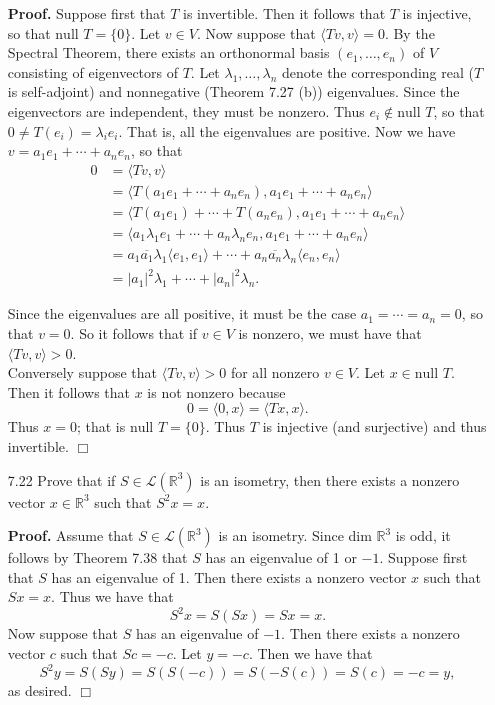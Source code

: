 \documentclass[9pt]{article}
\newcommand{\qed}{\hfill \ensuremath{\Box}}
\newcommand{\R}{\mathbb{R}}
\newcommand{\cyc}[1]{\langle #1 \rangle}
\begin{document}
\begin{enumerate}
      \textbf{Proof.} Suppose first that $T$ is invertible. Then it follows that
      $T$ is injective, so that $\text{null }T = \{0\}$. Let $v \in V$. Now 
      suppose that $\cyc{Tv, v} = 0$. By the Spectral Theorem, there exists an 
      orthonormal basis $(e_1, \ldots, e_n)$  of $V$ consisting of eigenvectors
      of $T$. Let $\lambda_1, \ldots, \lambda_n$ denote the corresponding real
      ($T$ is self-adjoint) and nonnegative (Theorem 7.27 (b)) eigenvalues. 
      Since the eigenvectors are independent, they must be nonzero. Thus
      $e_i \notin \text{null }T$, so that $0 \neq T(e_i) = \lambda_ie_i$. That
      is, all the eigenvalues are positive. Now we have
      $v = a_1e_1 + \cdots + a_ne_n$, so that
      \begin{align*}
         0 &= \cyc{Tv, v} \\
           &= \cyc{T(a_1e_1 + \cdots + a_ne_n), a_1e_1 + \cdots + a_ne_n} \\
           &= \cyc{T(a_1e_1) + \cdots + T(a_ne_n), a_1e_1 + \cdots + a_ne_n} \\
           &= \cyc{a_1\lambda_1e_1 + \cdots + a_n\lambda_ne_n,
                   a_1e_1 + \cdots + a_ne_n} \\
           &= a_1\overline{a_1}\lambda_1\cyc{e_1, e_1} + \cdots +
              a_n\overline{a_n}\lambda_n\cyc{e_n, e_n} \\
           &= |a_1|^2\lambda_1 + \cdots + |a_n|^2\lambda_n.
      \end{align*}

      Since the eigenvalues are all positive, it must be the case
      $a_1 = \cdots = a_n = 0$, so that $v = 0$. So it follows that if $v \in V$
      is nonzero, we must have that $\cyc{Tv, v} > 0$. \\

      Conversely suppose that $\cyc{Tv, v} > 0$ for all nonzero $v \in V$. Let
      $x \in \text{null }T$. Then it follows that $x$ is not nonzero because
      $$0 = \cyc{0, x} = \cyc{Tx, x}.$$
      Thus $x = 0$; that is $\text{null }T = \{0\}$. Thus $T$ is injective
      (and surjective) and thus invertible. \qed      
   \item[7.22] Prove that if $S \in \mathcal{L}(\R^3)$ is an isometry, then
               there exists a nonzero vector $x \in \R^3$ such that $S^2x = x$.

      \textbf{Proof.} Assume that $S \in \mathcal{L}(\R^3)$ is an isometry.
      Since dim $\R^3$ is odd, it follows by Theorem 7.38 that $S$ has an
      eigenvalue of 1 or $-1$. Suppose first that $S$ has an eigenvalue of 1.
      Then there exists a nonzero vector $x$ such that $Sx = x$. Thus we have
      that
      $$S^2x = S(Sx) = Sx = x.$$
      Now suppose that $S$ has an eigenvalue of $-1$. Then there exists a
      nonzero vector $c$ such that $Sc = -c$. Let $y = -c$. Then we have that
      $$S^2y = S(Sy) = S(S(-c)) = S(-S(c)) = S(c) = -c = y,$$
      as desired. \qed
\end{enumerate}
\end{document}
